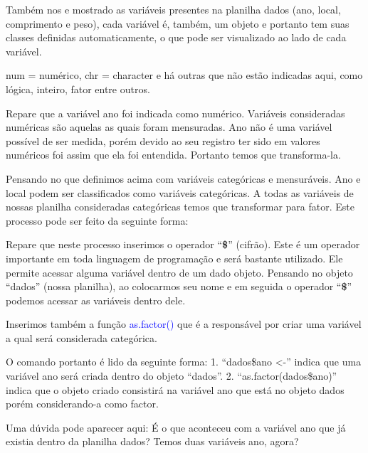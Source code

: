 \documentclass[titlepage, oneside, openany, a4paper]{book}
\newenvironment{Shaded}{\begin{snugshade}}{\end{snugshade}}
\newcommand{\KeywordTok}[1]{\textcolor[rgb]{0.13,0.29,0.53}{\textbf{#1}}}
\newcommand{\NormalTok}[1]{#1}
\newcommand{\OperatorTok}[1]{\textcolor[rgb]{0.81,0.36,0.00}{\textbf{#1}}}
\newcommand{\StringTok}[1]{\textcolor[rgb]{0.31,0.60,0.02}{#1}}
\begin{document}
Também nos e mostrado as variáveis presentes na planilha dados (ano, local, comprimento e peso), cada variável é, também, um objeto e portanto tem suas classes definidas automaticamente, o que pode ser visualizado ao lado de cada variável.

num = numérico, chr = character e há outras que não estão indicadas aqui, como lógica, inteiro, fator entre outros.

Repare que a variável ano foi indicada como numérico. Variáveis consideradas numéricas são aquelas as quais foram mensuradas. Ano não é uma variável possível de ser medida, porém devido ao seu registro ter sido em valores numéricos foi assim que ela foi entendida. Portanto temos que transforma-la.

Pensando no que definimos acima com variáveis categóricas e mensuráveis. Ano e local podem ser classificados como variáveis categóricas. A todas as variáveis de nossas planilha consideradas categóricas temos que transformar para fator. Este processo pode ser feito da seguinte forma:

\begin{Shaded}
\end{Shaded}

Repare que neste processo inserimos o operador ``\textbf{\$}'' (cifrão). Este é um operador importante em toda linguagem de programação e será bastante utilizado. Ele permite acessar alguma variável dentro de um dado objeto. Pensando no objeto ``dados'' (nossa planilha), ao colocarmos seu nome e em seguida o operador ``\textbf{\$}'' podemos acessar as variáveis dentro dele.

Inserimos também a função \textcolor{blue}{as.factor()} que é a responsável por criar uma variável a qual será considerada categórica.

O comando portanto é lido da seguinte forma:
1. ``dados\$ano \textless{}-'' indica que uma variável ano será criada dentro do objeto ``dados''.
2. ``as.factor(dados\$ano)'' indica que o objeto criado consistirá na variável ano que está no objeto dados porém considerando-a como factor.

Uma dúvida pode aparecer aqui: É o que aconteceu com a variável ano que já existia dentro da planilha dados? Temos duas variáveis ano, agora?
\end{document}
